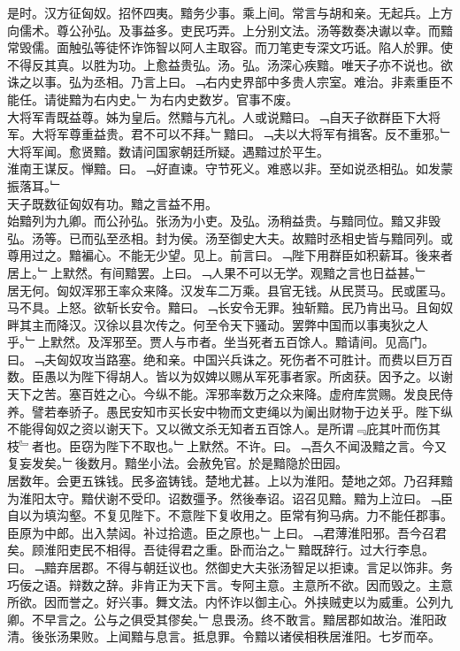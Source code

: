\documentclass{zhvt-classic}
\begin{document}
\hspace*{2em}是时。汉方征匈奴。招怀四夷。黯务少事。乘上间。常言与胡和亲。无起兵。上方向儒术。尊公孙弘。及事益多。吏民巧弄。上分别文法。汤等数奏决谳以幸。而黯常毁儒。面触弘等徒怀诈饰智以阿人主取容。而刀笔吏专深文巧诋。陷人於罪。使不得反其真。以胜为功。上愈益贵弘。汤。弘。汤深心疾黯。唯天子亦不说也。欲诛之以事。弘为丞相。乃言上曰。﹁右内史界部中多贵人宗室。难治。非素重臣不能任。请徙黯为右内史。﹂为右内史数岁。官事不废。\\
\hspace*{2em}大将军青既益尊。姊为皇后。然黯与亢礼。人或说黯曰。﹁自天子欲群臣下大将军。大将军尊重益贵。君不可以不拜。﹂黯曰。﹁夫以大将军有揖客。反不重邪。﹂大将军闻。愈贤黯。数请问国家朝廷所疑。遇黯过於平生。\\
\hspace*{2em}淮南王谋反。惮黯。曰。﹁好直谏。守节死义。难惑以非。至如说丞相弘。如发蒙振落耳。﹂\\
\hspace*{2em}天子既数征匈奴有功。黯之言益不用。\\
\hspace*{2em}始黯列为九卿。而公孙弘。张汤为小吏。及弘。汤稍益贵。与黯同位。黯又非毁弘。汤等。已而弘至丞相。封为侯。汤至御史大夫。故黯时丞相史皆与黯同列。或尊用过之。黯褊心。不能无少望。见上。前言曰。﹁陛下用群臣如积薪耳。後来者居上。﹂上默然。有间黯罢。上曰。﹁人果不可以无学。观黯之言也日益甚。﹂\\
\hspace*{2em}居无何。匈奴浑邪王率众来降。汉发车二万乘。县官无钱。从民贳马。民或匿马。马不具。上怒。欲斩长安令。黯曰。﹁长安令无罪。独斩黯。民乃肯出马。且匈奴畔其主而降汉。汉徐以县次传之。何至令天下骚动。罢弊中国而以事夷狄之人乎。﹂上默然。及浑邪至。贾人与市者。坐当死者五百馀人。黯请间。见高门。曰。﹁夫匈奴攻当路塞。绝和亲。中国兴兵诛之。死伤者不可胜计。而费以巨万百数。臣愚以为陛下得胡人。皆以为奴婢以赐从军死事者家。所卤获。因予之。以谢天下之苦。塞百姓之心。今纵不能。浑邪率数万之众来降。虚府库赏赐。发良民侍养。譬若奉骄子。愚民安知市买长安中物而文吏绳以为阑出财物于边关乎。陛下纵不能得匈奴之资以谢天下。又以微文杀无知者五百馀人。是所谓﹃庇其叶而伤其枝﹄者也。臣窃为陛下不取也。﹂上默然。不许。曰。﹁吾久不闻汲黯之言。今又复妄发矣。﹂後数月。黯坐小法。会赦免官。於是黯隐於田园。\\
\hspace*{2em}居数年。会更五铢钱。民多盗铸钱。楚地尤甚。上以为淮阳。楚地之郊。乃召拜黯为淮阳太守。黯伏谢不受印。诏数彊予。然後奉诏。诏召见黯。黯为上泣曰。﹁臣自以为填沟壑。不复见陛下。不意陛下复收用之。臣常有狗马病。力不能任郡事。臣原为中郎。出入禁闼。补过拾遗。臣之原也。﹂上曰。﹁君薄淮阳邪。吾今召君矣。顾淮阳吏民不相得。吾徒得君之重。卧而治之。﹂黯既辞行。过大行李息。曰。﹁黯弃居郡。不得与朝廷议也。然御史大夫张汤智足以拒谏。言足以饰非。务巧佞之语。辩数之辞。非肯正为天下言。专阿主意。主意所不欲。因而毁之。主意所欲。因而誉之。好兴事。舞文法。内怀诈以御主心。外挟贼吏以为威重。公列九卿。不早言之。公与之俱受其僇矣。﹂息畏汤。终不敢言。黯居郡如故治。淮阳政清。後张汤果败。上闻黯与息言。抵息罪。令黯以诸侯相秩居淮阳。七岁而卒。\\
\end{document}
